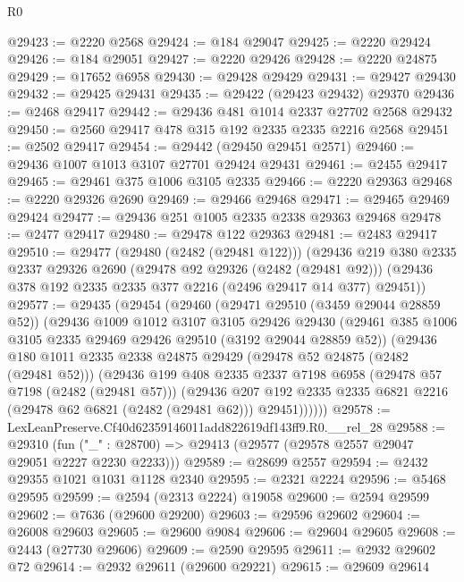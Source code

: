 \begin{lexlean}{R0}
\begin{coremodule}
@29423 := @2220 @2568
@29424 := @184 @29047
@29425 := @2220 @29424
@29426 := @184 @29051
@29427 := @2220 @29426
@29428 := @2220 @24875
@29429 := @17652 @6958
@29430 := @29428 @29429
@29431 := @29427 @29430
@29432 := @29425 @29431
@29435 := @29422 (@29423 @29432) @29370
@29436 := @2468 @29417
@29442 := @29436 @481 @1014 @2337 @27702 @2568 @29432
@29450 := @2560 @29417 @478 @315 @192 @2335 @2335 @2216 @2568
@29451 := @2502 @29417
@29454 := @29442 (@29450 @29451 @2571)
@29460 := @29436 @1007 @1013 @3107 @27701 @29424 @29431
@29461 := @2455 @29417
@29465 := @29461 @375 @1006 @3105 @2335
@29466 := @2220 @29363
@29468 := @2220 @29326 @2690
@29469 := @29466 @29468
@29471 := @29465 @29469 @29424
@29477 := @29436 @251 @1005 @2335 @2338 @29363 @29468
@29478 := @2477 @29417
@29480 := @29478 @122 @29363
@29481 := @2483 @29417
@29510 := @29477
    (@29480 (@2482 (@29481 @122)))
    (@29436
      @219
      @380
      @2335
      @2337
      @29326
      @2690
      (@29478 @92 @29326 (@2482 (@29481 @92)))
      (@29436 @378 @192 @2335 @2335 @377 @2216 (@2496 @29417 @14 @377) @29451))
@29577 := @29435
    (@29454
      (@29460
        (@29471 @29510 (@3459 @29044 @28859 @52))
        (@29436
          @1009
          @1012
          @3107
          @3105
          @29426
          @29430
          (@29461 @385 @1006 @3105 @2335 @29469 @29426 @29510 (@3192 @29044 @28859 @52))
          (@29436
            @180
            @1011
            @2335
            @2338
            @24875
            @29429
            (@29478 @52 @24875 (@2482 (@29481 @52)))
            (@29436
              @199
              @408
              @2335
              @2337
              @7198
              @6958
              (@29478 @57 @7198 (@2482 (@29481 @57)))
              (@29436
                @207
                @192
                @2335
                @2335
                @6821
                @2216
                (@29478 @62 @6821 (@2482 (@29481 @62)))
                @29451))))))
@29578 := LexLeanPreserve.Cf40d62359146011add822619df143ff9.R0.__rel_28
@29588 := @29310
    (fun ("_" : @28700) => @29413 (@29577 (@29578 @2557 @29047 @29051 @2227 @2230 @2233)))
@29589 := @28699 @2557
@29594 := @2432 @29355 @1021 @1031 @1128 @2340
@29595 := @2321 @2224
@29596 := @5468 @29595
@29599 := @2594 (@2313 @2224) @19058
@29600 := @2594 @29599
@29602 := @7636 (@29600 @29200)
@29603 := @29596 @29602
@29604 := @26008 @29603
@29605 := @29600 @9084
@29606 := @29604 @29605
@29608 := @2443 (@27730 @29606)
@29609 := @2590 @29595
@29611 := @2932 @29602 @72
@29614 := @2932 @29611 (@29600 @29221)
@29615 := @29609 @29614

\end{coremodule}
\end{lexlean}

